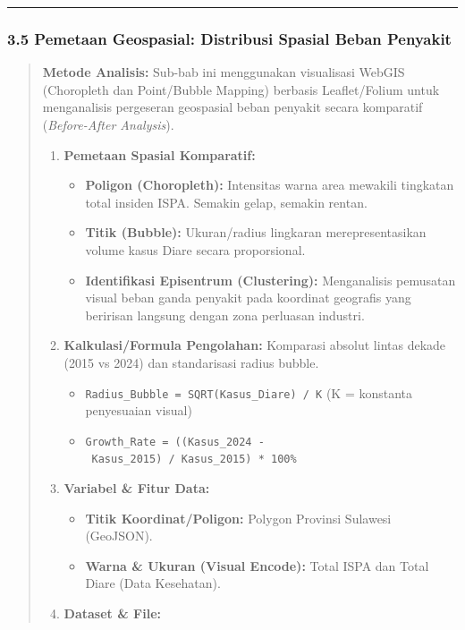 \documentclass[
]{article}
\providecommand{\tightlist}{%
  \setlength{\itemsep}{0pt}\setlength{\parskip}{0pt}}
\begin{document}
\begin{center}\rule{0.5\linewidth}{0.5pt}\end{center}

\subsubsection{3.5 Pemetaan Geospasial: Distribusi Spasial Beban
Penyakit}\label{pemetaan-geospasial-distribusi-spasial-beban-penyakit}

\begin{quote}
\textbf{Metode Analisis:} Sub-bab ini menggunakan visualisasi WebGIS
(Choropleth dan Point/Bubble Mapping) berbasis Leaflet/Folium untuk
menganalisis pergeseran geospasial beban penyakit secara komparatif
(\emph{Before-After Analysis}).

\begin{enumerate}
\def\labelenumi{\arabic{enumi}.}
\tightlist
\item
  \textbf{Pemetaan Spasial Komparatif:}

  \begin{itemize}
  \tightlist
  \item
    \textbf{Poligon (Choropleth):} Intensitas warna area mewakili
    tingkatan total insiden ISPA. Semakin gelap, semakin rentan.
  \item
    \textbf{Titik (Bubble):} Ukuran/radius lingkaran merepresentasikan
    volume kasus Diare secara proporsional.
  \item
    \textbf{Identifikasi Episentrum (Clustering):} Menganalisis
    pemusatan visual beban ganda penyakit pada koordinat geografis yang
    beririsan langsung dengan zona perluasan industri.
  \end{itemize}
\item
  \textbf{Kalkulasi/Formula Pengolahan:} Komparasi absolut lintas dekade
  (2015 vs 2024) dan standarisasi radius bubble.

  \begin{itemize}
  \tightlist
  \item
    \texttt{Radius\_Bubble\ =\ SQRT(Kasus\_Diare)\ /\ K} (K = konstanta
    penyesuaian visual)
  \item
    \texttt{Growth\_Rate\ =\ ((Kasus\_2024\ -\ Kasus\_2015)\ /\ Kasus\_2015)\ *\ 100\%}
  \end{itemize}
\item
  \textbf{Variabel \& Fitur Data:}

  \begin{itemize}
  \tightlist
  \item
    \textbf{Titik Koordinat/Poligon:} Polygon Provinsi Sulawesi
    (GeoJSON).
  \item
    \textbf{Warna \& Ukuran (Visual Encode):} Total ISPA dan Total Diare
    (Data Kesehatan).
  \end{itemize}
\item
  \textbf{Dataset \& File:}


\end{enumerate}
\end{quote}
\end{document}
